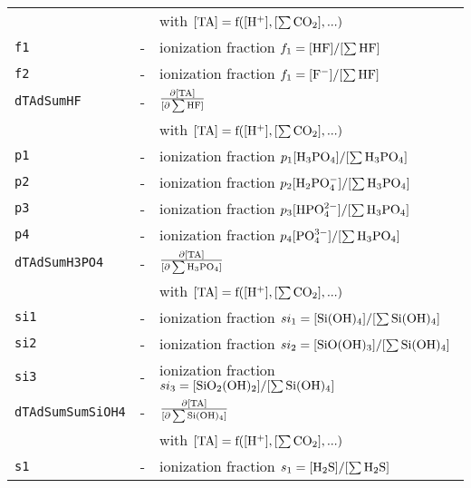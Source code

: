 \documentclass[article,nojss]{jss}
\begin{document}
\begin{footnotesize}
\begin{longtable}{l|l|p{7cm}}
            &                                 & with $\rm [TA] = f([H^+], [\sum CO_2], ...)$\\   
\texttt{f1}          & -                               & ionization fraction $f_1 = [\rm HF]/[\rm \sum HF]$\\               
\texttt{f2}          & -                               & ionization fraction $f_1 = [\rm F^-]/[\rm \sum HF]$\\               
\texttt{dTAdSumHF}   & -                               & $\rm \frac{\partial [TA]}{[\partial \sum HF]}$\\
            &                                 & with $\rm [TA] = f([H^+], [\sum CO_2], ...)$\\    
\texttt{p1}         & -                                 & ionization fraction $p_1 [\rm H_3PO_4]/[\rm \sum H_3PO_4]$\\
\texttt{p2}         & -                                & ionization fraction $p_2 [\rm H_2PO_4^-]/[\rm \sum H_3PO_4]$\\
\texttt{p3}        & -                                & ionization fraction $p_3 [\rm HPO_4^{2-}]/[\rm \sum H_3PO_4]$\\
\texttt{p4}         & -                                & ionization fraction $p_4 [\rm PO_4^{3-}]/[\rm \sum H_3PO_4]$\\
\texttt{dTAdSumH3PO4}   & -                               & $\rm \frac{\partial [TA]}{[\partial \sum H_3PO_4]}$\\
                   &                                  & with $\rm [TA] = f([H^+], [\sum CO_2], ...)$\\        
\texttt{si1}        & -                               & ionization fraction $si_1 = [\rm Si(OH)_4]  / [\rm \sum Si(OH)_4]$\\
\texttt{si2}        & -                               & ionization fraction $si_2 = [\rm SiO(OH)_3]  / [\rm \sum Si(OH)_4]$\\
\texttt{si3}        & -                               & ionization fraction $si_3 = [\rm SiO_2(OH)_2]  / [\rm \sum Si(OH)_4]$\\
\texttt{dTAdSumSumSiOH4}   & -                               & $\rm \frac{\partial [TA]}{[\partial \sum Si(OH)_4]}$\\
                   &                                  & with $\rm [TA] = f([H^+], [\sum CO_2], ...)$\\        
\texttt{s1}       & -                                & ionization fraction $s_1 = [\rm H_2S]  / [\rm \sum H_2S]$\\

\end{longtable}
\end{footnotesize}
\end{document}
